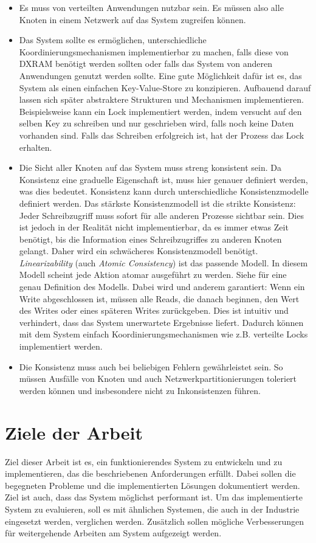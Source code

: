 \begin{itemize}
	\item Es muss von verteilten Anwendungen nutzbar sein. Es müssen also alle Knoten in einem Netzwerk auf das System zugreifen können.
	\item Das System sollte es ermöglichen, unterschiedliche Koordinierungsmechanismen implementierbar zu machen, falls diese von DXRAM benötigt werden sollten oder falls das System von anderen Anwendungen genutzt werden sollte. Eine gute Möglichkeit dafür ist es, das System als einen einfachen Key-Value-Store zu konzipieren. Aufbauend darauf lassen sich später abstraktere Strukturen und Mechanismen implementieren. Beispielsweise kann ein Lock implementiert werden, indem versucht auf den selben Key zu schreiben und nur geschrieben wird, falls noch keine Daten vorhanden sind. Falls das Schreiben erfolgreich ist, hat der Prozess das Lock erhalten.
	\item Die Sicht aller Knoten auf das System muss streng konsistent sein. Da Konsistenz eine graduelle Eigenschaft ist, muss hier genauer definiert werden, was dies bedeutet. Konsistenz kann durch unterschiedliche Konsistenzmodelle definiert werden. Das stärkste Konsistenzmodell ist die strikte Konsistenz: Jeder Schreibzugriff muss sofort für alle anderen Prozesse sichtbar sein. Dies ist jedoch in der Realität nicht implementierbar, da es immer etwas Zeit benötigt, bis die Information eines Schreibzugriffes zu anderen Knoten gelangt. Daher wird ein schwächeres Konsistenzmodell benötigt.  \textit{Linearizability} (auch \textit{Atomic Consistency}) ist das passende Modell. In diesem Modell scheint jede Aktion atomar ausgeführt zu werden. Siehe \cite{linearizability} für eine genau Definition des Modells. Dabei wird und anderem garantiert: Wenn ein Write abgeschlossen ist, müssen alle Reads, die danach beginnen, den Wert des Writes oder eines späteren Writes zurückgeben. Dies ist intuitiv und verhindert, dass das System unerwartete Ergebnisse liefert. Dadurch können mit dem System einfach Koordinierungsmechanismen wie z.B. verteilte Locks implementiert werden.
	\item Die Konsistenz muss auch bei beliebigen Fehlern gewährleistet sein. So müssen Ausfälle von Knoten und auch Netzwerkpartitionierungen toleriert werden können und insbesondere nicht zu Inkonsistenzen führen.
\end{itemize}

\section{Ziele der Arbeit}
\label{ziele}

Ziel dieser Arbeit ist es, ein funktionierendes System zu entwickeln und zu implementieren, das die beschriebenen Anforderungen erfüllt. Dabei sollen die begegneten Probleme und die implementierten Lösungen dokumentiert werden. Ziel ist auch, dass das System möglichst performant ist. Um das implementierte System zu evaluieren, soll es mit ähnlichen Systemen, die auch in der Industrie eingesetzt werden, verglichen werden. Zusätzlich sollen mögliche Verbesserungen für weitergehende Arbeiten am System aufgezeigt werden.
